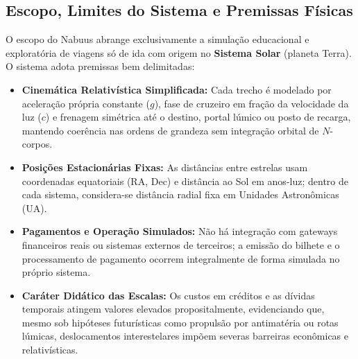 \documentclass[12pt, a4paper]{article}
\begin{document}
\subsection{Escopo, Limites do Sistema e Premissas Físicas}
O escopo do Nabuus abrange exclusivamente a simulação educacional e exploratória de viagens só de ida com origem no \textbf{Sistema Solar} (planeta Terra). O sistema adota premissas bem delimitadas:
\begin{itemize}
    \item \textbf{Cinemática Relativística Simplificada:} Cada trecho é modelado por aceleração própria constante ($g$), fase de cruzeiro em fração da velocidade da luz ($c$) e frenagem simétrica até o destino, portal lúmico ou posto de recarga, mantendo coerência nas ordens de grandeza sem integração orbital de $N$-corpos.
    \item \textbf{Posições Estacionárias Fixas:} As distâncias entre estrelas usam coordenadas equatoriais (RA, Dec) e distância ao Sol em anos-luz; dentro de cada sistema, considera-se distância radial fixa em Unidades Astronômicas (UA).
    \item \textbf{Pagamentos e Operação Simulados:} Não há integração com gateways financeiros reais ou sistemas externos de terceiros; a emissão do bilhete e o processamento de pagamento ocorrem integralmente de forma simulada no próprio sistema.
    \item \textbf{Caráter Didático das Escalas:} Os custos em créditos e as dívidas temporais atingem valores elevados propositalmente, evidenciando que, mesmo sob hipóteses futurísticas como propulsão por antimatéria ou rotas lúmicas, deslocamentos interestelares impõem severas barreiras econômicas e relativísticas.
\end{itemize}
\end{document}
